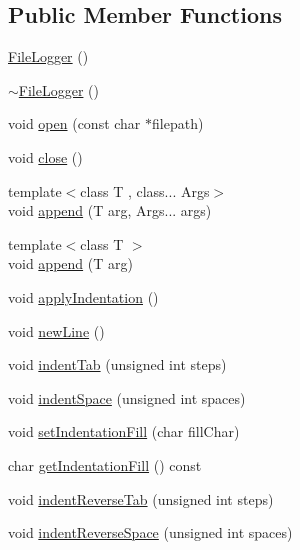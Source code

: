 \subsection*{Public Member Functions}
\begin{DoxyCompactItemize}
\item 
\mbox{\hyperlink{classutl_1_1_file_logger_af863c2a6176181b6c252ff91a46760fa}{File\+Logger}} ()
\item 
\mbox{\hyperlink{classutl_1_1_file_logger_a2bbc4a7a41145e14efaafb9563a8a869}{$\sim$\+File\+Logger}} ()
\item 
void \mbox{\hyperlink{classutl_1_1_file_logger_ae6d5cb6373539a82bb3454f096dabffa}{open}} (const char $\ast$filepath)
\item 
void \mbox{\hyperlink{classutl_1_1_file_logger_a6387ffc4a38549b5350efb1f68064f9c}{close}} ()
\item 
{\footnotesize template$<$class T , class... Args$>$ }\\void \mbox{\hyperlink{classutl_1_1_file_logger_a3f9d36c6d5002e05187d367ae25f9143}{append}} (T arg, Args... args)
\item 
{\footnotesize template$<$class T $>$ }\\void \mbox{\hyperlink{classutl_1_1_file_logger_a109d62802abff9c7345e183e533bad5b}{append}} (T arg)
\item 
void \mbox{\hyperlink{classutl_1_1_file_logger_a83ac977b8c60b89f2a1762b429a2ba27}{apply\+Indentation}} ()
\item 
void \mbox{\hyperlink{classutl_1_1_file_logger_a5f1849d0a5959eca4eeb3ecc94b6d2ca}{new\+Line}} ()
\item 
void \mbox{\hyperlink{classutl_1_1_file_logger_a160943debc1ae1af4bf9f6a29597d65a}{indent\+Tab}} (unsigned int steps)
\item 
void \mbox{\hyperlink{classutl_1_1_file_logger_ac3372afe55730aa4416cc12f0e2eefb5}{indent\+Space}} (unsigned int spaces)
\item 
void \mbox{\hyperlink{classutl_1_1_file_logger_ae43ccca126ae9652bd4a077b9d38def2}{set\+Indentation\+Fill}} (char fill\+Char)
\item 
char \mbox{\hyperlink{classutl_1_1_file_logger_a2c0041e83ed565fe78e6ef23d528a876}{get\+Indentation\+Fill}} () const
\item 
void \mbox{\hyperlink{classutl_1_1_file_logger_aff2801824bc5acb26093a96996eabcb2}{indent\+Reverse\+Tab}} (unsigned int steps)
\item 
void \mbox{\hyperlink{classutl_1_1_file_logger_ac3b2b167b38e725c4b10d15123885dc6}{indent\+Reverse\+Space}} (unsigned int spaces)

\end{DoxyCompactItemize}
